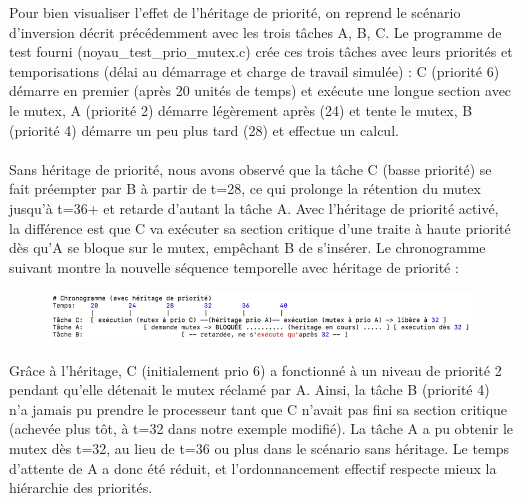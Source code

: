 \documentclass{latexPackage/utc-report/utc-report}
\begin{document}
Pour bien visualiser l’effet de l’héritage de priorité, on reprend le scénario d’inversion décrit précédemment avec les trois tâches A, B, C. Le programme de test fourni (noyau\_test\_prio\_mutex.c) crée ces trois tâches avec leurs priorités et temporisations (délai au démarrage et charge de travail simulée) : C (priorité 6) démarre en premier (après 20 unités de temps) et exécute une longue section avec le mutex, A (priorité 2) démarre légèrement après (24) et tente le mutex, B (priorité 4) démarre un peu plus tard (28) et effectue un calcul.
\\\\
Sans héritage de priorité, nous avons observé que la tâche C (basse priorité) se fait préempter par B à partir de t=28, ce qui prolonge la rétention du mutex jusqu’à t=36+ et retarde d’autant la tâche A. Avec l’héritage de priorité activé, la différence est que C va exécuter sa section critique d’une traite à haute priorité dès qu’A se bloque sur le mutex, empêchant B de s’insérer. Le chronogramme suivant montre la nouvelle séquence temporelle avec héritage de priorité :

\begin{figure}[H]
    \centering
    \includegraphics[width=15cm]{images/chrono2}
\end{figure}

Grâce à l’héritage, C (initialement prio 6) a fonctionné à un niveau de priorité 2 pendant qu’elle détenait le mutex réclamé par A. Ainsi, la tâche B (priorité 4) n’a jamais pu prendre le processeur tant que C n’avait pas fini sa section critique (achevée plus tôt, à t=32 dans notre exemple modifié). La tâche A a pu obtenir le mutex dès t=32, au lieu de t=36 ou plus dans le scénario sans héritage. Le temps d’attente de A a donc été réduit, et l’ordonnancement effectif respecte mieux la hiérarchie des priorités.

\pagebreak
\end{document}
